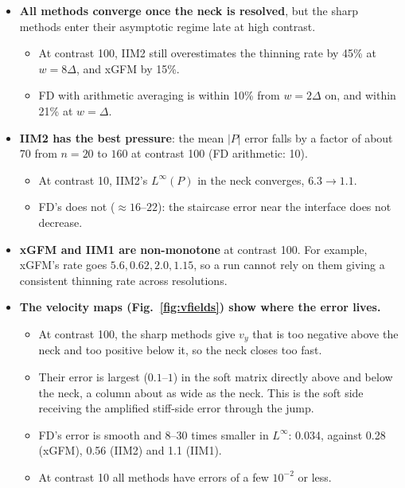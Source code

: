 \documentclass[11pt,a4paper]{article}
\begin{document}
\begin{itemize}
  \item \textbf{All methods converge once the neck is resolved}, but the sharp methods enter
    their asymptotic regime late at high contrast.
    \begin{itemize}
      \item At contrast 100, IIM2 still overestimates the thinning rate by 45\% at
        $w = 8\Delta$, and xGFM by 15\%.
      \item FD with arithmetic averaging is within 10\% from $w = 2\Delta$ on, and within 21\% at
        $w = \Delta$.
    \end{itemize}
  \item \textbf{IIM2 has the best pressure}: the mean $|P|$ error falls by a factor of about 70
    from $n = 20$ to $160$ at contrast 100 (FD arithmetic: 10).
    \begin{itemize}
      \item At contrast 10, IIM2's $L^\infty(P)$ in the neck converges, $6.3 \to 1.1$.
      \item FD's does not ($\approx 16$--$22$): the staircase error near the interface does not
        decrease.
    \end{itemize}
  \item \textbf{xGFM and IIM1 are non-monotone} at contrast 100. For example, xGFM's rate goes
    $5.6, 0.62, 2.0, 1.15$, so a run cannot rely on them giving a consistent thinning rate across
    resolutions.
  \item \textbf{The velocity maps (Fig.~\ref{fig:vfields}) show where the error lives.}
    \begin{itemize}
      \item At contrast 100, the sharp methods give $v_y$ that is too negative above the neck and
        too positive below it, so the neck closes too fast.
      \item Their error is largest ($0.1$--$1$) in the soft matrix directly above and below the
        neck, a column about as wide as the neck. This is the soft side receiving the amplified
        stiff-side error through the jump.
      \item FD's error is smooth and 8--30 times smaller in $L^\infty$: 0.034, against 0.28
        (xGFM), 0.56 (IIM2) and 1.1 (IIM1).
      \item At contrast 10 all methods have errors of a few $10^{-2}$ or less.
    \end{itemize}
\end{itemize}
\end{document}
